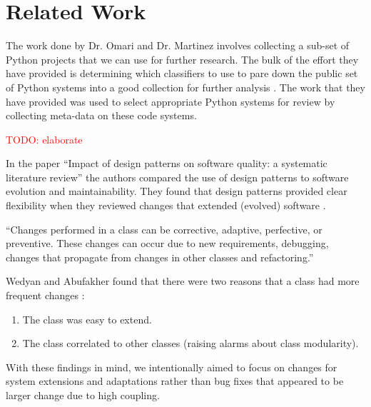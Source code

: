 \documentclass[12pt,conference]{IEEEtran}
\newcommand\todo[1]{\textcolor{red}{#1}}
\begin{document}
\vspace{0.5cm}
\section{Related Work}
\vspace{0.25cm}

The work done by Dr. Omari and Dr. Martinez involves collecting a sub-set of Python projects that we can use for further research. The bulk of the effort they have provided is determining which classifiers to use to pare down the public set of Python systems into a good collection for further analysis \cite{omari:2018}. The work that they have provided was used to select appropriate Python systems for review by collecting meta-data on these code systems.

\todo{TODO: elaborate}

In the paper ``Impact of design patterns on software quality: a systematic literature review'' the authors compared the use of design patterns to software evolution and maintainability. They found that design patterns provided clear flexibility when they reviewed changes that extended (evolved) software \cite{wedyan:2020}.

\vspace{0.25cm}

\begin{displayquote}
``Changes performed in a class can be corrective, adaptive, perfective, or preventive. These changes can occur due to new requirements, debugging, changes that propagate from changes in other classes and refactoring.''
\end{displayquote}

\vspace{0.25cm}

Wedyan and Abufakher found that there were two reasons that a class had more frequent changes \cite{wedyan:2020}:

\vspace{0.25cm}

\begin{enumerate}
    \item The class was easy to extend.
    \item The class correlated to other classes (raising alarms about class modularity).
\end{enumerate}

\vspace{0.25cm}

With these findings in mind, we intentionally aimed to focus on changes for system extensions and adaptations rather than bug fixes that appeared to be larger change due to high coupling.
\end{document}
